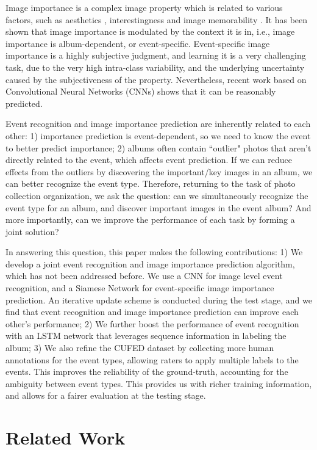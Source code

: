 \documentclass[runningheads]{llncs}
\begin{document}
Image importance is a complex image property which is related to various factors, such as aesthetics \cite{aesthe_14}, interestingness \cite{interesting} and image memorability \cite{Isola2011}. It has been shown \cite{CVPR} that image importance is modulated by the context it is in, i.e., image importance is album-dependent, or event-specific. Event-specific image importance is a highly subjective judgment, and learning it is a very challenging task, due to the very high intra-class variability, and the underlying uncertainty caused by the subjectiveness of the property. Nevertheless, recent work \cite{CVPR} based on Convolutional Neural Networks (CNNs) shows that it can be reasonably predicted. 

Event recognition and image importance prediction are inherently related to each other: 1) importance prediction is event-dependent, so we need to know the event to better predict importance; 2) albums often contain ``outlier" photos that aren't directly related to the event, which affects event prediction. If we can reduce effects from the outliers by discovering the important/key images in an album, we can better recognize the event type.  Therefore, returning to the task of photo collection organization, we ask the question: can we simultaneously recognize the event type for an album, and discover important images in the event album? And more importantly, can we improve the performance of each task by forming a joint solution?

In answering this question, this paper makes the following contributions: 1) We develop a joint event recognition and image importance prediction algorithm, which has not been addressed before. We use a CNN for image level event recognition, and a Siamese Network for event-specific image importance prediction. An iterative update scheme is conducted during the test stage, and we find that event recognition and image importance prediction can improve each other's performance; 2) We further boost the performance of event recognition with an LSTM network that leverages sequence information in labeling the album; 3) We also refine the CUFED dataset by collecting more human annotations for the event types, allowing raters to apply multiple labels to the events. This improves the reliability of the ground-truth, accounting for the ambiguity between event types. This provides us with richer training information, and allows for a fairer evaluation at the testing stage.

\section{Related Work}
\end{document}
